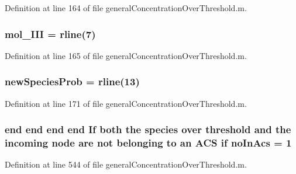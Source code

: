 Definition at line 164 of file general\+Concentration\+Over\+Threshold.\+m.

\hypertarget{a00028_adf61c91ad9a34233b3fe493e21f8969e}{
\subsubsection[{mol\+\_\+\+I\+I\+I}]{\setlength{\rightskip}{0pt plus 5cm}mol\+\_\+\+I\+I\+I = {\bf rline}(7)}}\label{a00028_adf61c91ad9a34233b3fe493e21f8969e}


Definition at line 165 of file general\+Concentration\+Over\+Threshold.\+m.

\hypertarget{a00028_aa66147edba72bc0b9cf591cd7475396f}{
\subsubsection[{new\+Species\+Prob}]{\setlength{\rightskip}{0pt plus 5cm}new\+Species\+Prob = {\bf rline}(13)}}\label{a00028_aa66147edba72bc0b9cf591cd7475396f}


Definition at line 171 of file general\+Concentration\+Over\+Threshold.\+m.

\hypertarget{a00028_ac45b9c97670e4b4e103ce174dc2db6b3}{
\subsubsection[{no\+In\+Acs}]{ {\bf end} {\bf end} {\bf end} {\bf end} If both the {\bf species} over {\bf threshold} {\bf and} the incoming node are not belonging {\bf to} an {\bf A\+C\+S} {\bf if} no\+In\+Acs = 1}}\label{a00028_ac45b9c97670e4b4e103ce174dc2db6b3}


Definition at line 544 of file general\+Concentration\+Over\+Threshold.\+m.

